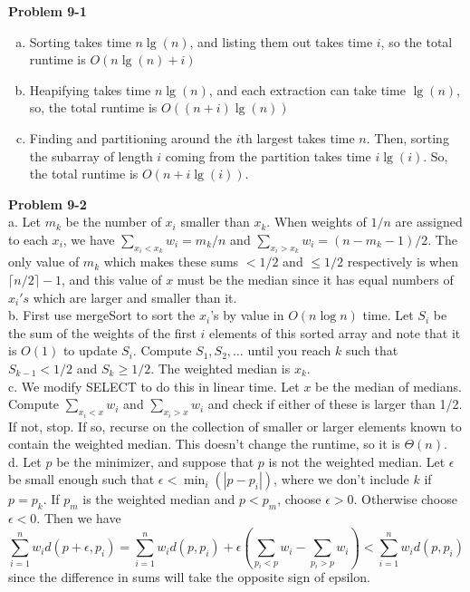\documentclass{article}
\begin{document}
\noindent\textbf{ Problem 9-1} \\
\begin{enumerate}[a.]
\item
Sorting takes time $n\lg(n)$, and listing them out takes time $i$, so the total runtime is $O(n\lg(n)+i)$

\item
Heapifying takes time $n\lg(n)$, and each extraction can take time $\lg(n)$, so, the total runtime is $O((n+i)\lg(n))$ 

\item
Finding and partitioning around the $i$th largest takes time $n$. Then, sorting the subarray of length $i$ coming from the partition takes time $i\lg(i)$. So, the total runtime is $O(n+i\lg(i))$.

\end{enumerate}

\noindent\textbf{Problem 9-2} \\

a. Let $m_k$ be the number of $x_i$ smaller than $x_k$.  When weights of $1/n$ are assigned to each $x_i$, we have $\sum_{x_i < x_k} w_i = m_k/n$ and $\sum_{x_i > x_k} w_i = (n-m_k-1)/2$.  The only value of $m_k$ which makes these sums $<1/2$ and $\leq 1/2$ respectively is when $\lceil n/2 \rceil - 1$, and this value of $x$ must be the median since it has equal numbers of $x_i's$ which are larger and smaller than it. \\

b. First use mergeSort to sort the $x_i$'s by value in $O(n \log n)$ time.  Let $S_i$ be the sum of the weights of the first $i$ elements of this sorted array and note that it is $O(1)$ to update $S_i$.  Compute $S_1, S_2, \ldots$ until you reach $k$ such that $S_{k-1}<1/2$ and $S_k \geq 1/2$.  The weighted median is $x_k$. \\

c. We modify SELECT to do this in linear time.  Let $x$ be the median of medians.  Compute $\sum_{x_i < x}w_i$ and $\sum_{x_i > x}w_i$ and check if either of these is larger than 1/2.  If not, stop.  If so, recurse on the collection of smaller or larger elements known to contain the weighted median. This doesn't change the runtime, so it is $\Theta(n)$. \\

d. Let $p$ be the minimizer, and suppose that $p$ is not the weighted median.  Let $\epsilon$ be small enough such that $\epsilon < \min_{i}(|p-p_i|)$, where we don't include $k$ if $p = p_k$.  If $p_m$ is the weighted median and $p < p_m$, choose $\epsilon > 0$.  Otherwise choose $\epsilon < 0$.  Then we have
\[ \sum_{i=1}^n w_i d(p+\epsilon, p_i) = \sum_{i=1}^n w_i d(p,p_i) + \epsilon \left( \sum_{p_i < p} w_i - \sum_{p_i > p} w_i \right) < \sum_{i=1}^n w_i d(p, p_i) \]
since the difference in sums will take the opposite sign of epsilon. \\
\end{document}
